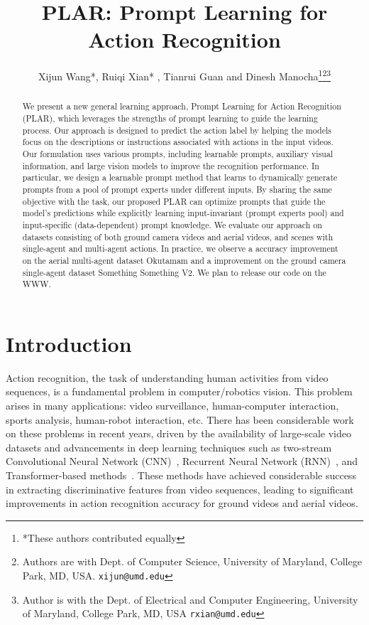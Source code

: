 \documentclass[letterpaper, 10 pt, conference]{ieeeconf}
\title{PLAR: Prompt Learning for Action Recognition}
\author{Xijun Wang*, Ruiqi Xian* , Tianrui Guan and Dinesh Manocha\thanks{*These authors contributed equally}\thanks{Authors are with Dept. of Computer Science, University of Maryland, College Park, MD, USA.
        {\tt\small xijun@umd.edu}}\thanks{Author is with the Dept. of Electrical and Computer Engineering, University of Maryland, College Park, MD, USA
        {\tt\small rxian@umd.edu}}}
\begin{document}
\maketitle
\thispagestyle{empty}
\pagestyle{empty}
\begin{abstract}




We present a new general learning approach, Prompt Learning for Action Recognition (PLAR), which leverages the strengths of prompt learning to guide the learning process. Our approach is designed to predict the action label by helping the models focus on the descriptions or instructions associated with actions in the input videos. Our formulation uses various prompts, including learnable prompts, auxiliary visual information, and large vision models to improve the recognition performance. In particular, we design a learnable prompt method that learns to dynamically generate prompts from a pool of prompt experts under different inputs. By sharing the same objective with the task, our proposed PLAR can optimize prompts that guide the model's predictions while explicitly learning input-invariant (prompt experts pool) and input-specific (data-dependent) prompt knowledge. We evaluate our approach on datasets consisting of both ground camera videos and aerial videos, and scenes with single-agent and multi-agent actions. In practice, we observe a  accuracy improvement on the aerial multi-agent dataset Okutamam and a  improvement on the ground camera single-agent dataset Something Something V2. We plan to release our code on the WWW. 

\end{abstract}


%
 \section{Introduction}

Action recognition, the task of understanding human activities from video sequences, is a fundamental problem in computer/robotics vision. This problem arises in many applications: video surveillance, human-computer interaction,  sports analysis, human-robot interaction, etc. There has been considerable work on these problems in recent years, driven by the availability of large-scale video datasets and advancements in deep learning techniques such as two-stream Convolutional Neural Network (CNN)~\cite{simonyan2014two}, Recurrent Neural Network (RNN)~\cite{sun2017lattice}, and Transformer-based methods~\cite{vaswani2017attention,li2022mvitv2}. These methods have achieved considerable success in extracting discriminative features from video sequences, leading to significant improvements in action recognition accuracy for ground videos and aerial videos.
\end{document}

